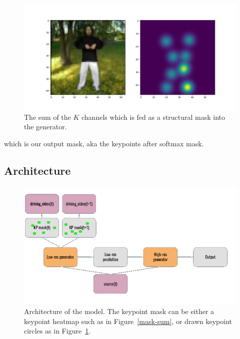 \documentclass{article}
\begin{document}
\begin{figure}[ht]
\vskip 0.2in
\begin{center}
\centerline{\includegraphics[width=\columnwidth]{visualizations/softmax_sumkp}}
\caption{
The sum of the $K$ channels which is fed as a structural mask into the
generator.
}
\label{softmax-sum}
\end{center}
\vskip -0.2in
\end{figure}
which is our output mask, aka the keypoints after softmax mask.

\subsection{Architecture}
\label{method}

\begin{figure}[ht]
\vskip 0.2in
\begin{center}
\centerline{\includegraphics[width=\columnwidth]{visualizations/architecture}}
\caption{Architecture of the model. The keypoint mask can be either a
keypoint heatmap such as in Figure~\ref{mask-sum}, or drawn keypoint
circles as in Figure~\ref{softmax-sum}.}
\label{arch}
\end{center}
\vskip -0.2in
\end{figure}
\end{document}
